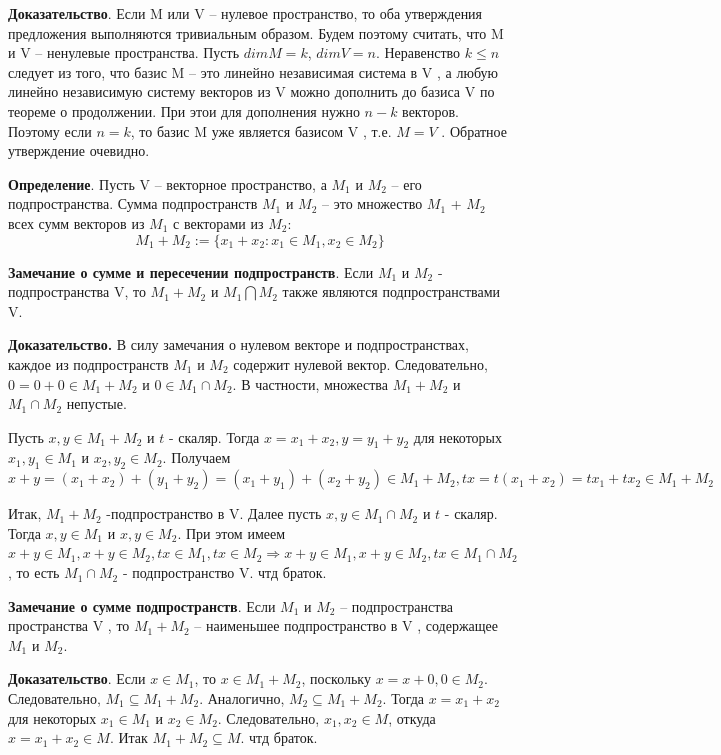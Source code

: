 \documentclass[a4paper]{article}
\begin{document}
{\begin{small}
\textbf{Доказательство}. Если M или V – нулевое пространство, то оба
утверждения предложения выполняются тривиальным образом. Будем
поэтому считать, что M и V – ненулевые пространства. Пусть $dim M = k$,
$dim V = n$. Неравенство $k \leq n$ следует из того, что базис M – это линейно
независимая система в V , а любую линейно независимую систему
векторов из V можно дополнить до базиса V по теореме о продолжении. При этои для дополнения нужно $n-k$ векторов. Поэтому если $n=k$, то базис M уже является базисом V , т.е. $M = V$ . Обратное утверждение очевидно.

\textbf{Определение}. Пусть V – векторное пространство, а $M_1$ и $M_2$ – его подпространства.
Сумма подпространств $M_1$ и $M_2$ – это множество $M_1$ + $M_2$ всех сумм
векторов из $M_1$ с векторами из $M_2$:
\begin{equation}
M_1+M_2 := \{ x_1 + x_2: x_1 \in M_1, x_2 \in M_2 \}
\end{equation}

\textbf{Замечание о сумме и пересечении подпространств}. Если $M_1$ и $M_2$ - подпространства V, то $M_1+M_2$ и $M_1 \bigcap M_2$ также являются подпространствами V.

\textbf{Доказательство.} В силу замечания о нулевом векторе и подпространствах,
каждое из подпространств $M_1$ и $M_2$ содержит нулевой вектор. Следовательно, $0=0+0 \in M_1+M_2$ и $0 \in M_1 \cap M_2$. В частности, множества $M_1+M_2$ и $M_1 \cap M_2$ непустые.

Пусть $x, y \in M_1+M_2$ и $t$ - скаляр. Тогда $x=x_1+x_2, y=y_1+y_2$ для некоторых $x_1, y_1 \in M_1$ и $x_2, y_2 \in M_2$. Получаем \begin{equation}
x+y = (x_1+x_2) + (y_1+y_2) = (x_1+y_1)+(x_2+y_2) \in M_1 + M_2, tx = t(x_1 + x_2) = tx_1 + tx_2 \in M_1 + M_2
\end{equation}

Итак, $M_1+M_2$ -подпространство в V. Далее пусть $x, y \in M_1 \cap M_2$ и $t$ - скаляр. Тогда $x, y \in M_1$ и $x, y \in M_2$. При этом имеем $x+y \in M_1, x+y \in M_2, tx \in M_1, tx \in M_2 \Rightarrow x+y \in M_1, x+y \in M_2, tx \in M_1 \cap M_2$, то есть $M_1 \cap M_2$ - подпространство V. чтд браток.

\textbf{Замечание о сумме подпространств}. Если $M_1$ и $M_2$ – подпространства пространства V , то $M_1 + M_2$ –
наименьшее подпространство в V , содержащее $M_1$ и $M_2$.

\textbf{Доказательство}. Если $x \in M_1$, то $x \in M_1 + M_2$, поскольку $x = x + 0, 0 \in M_2$. Следовательно, $M_1 \subseteq M_1 + M_2$. Аналогично, $M_2 \subseteq M_1 + M_2$. Тогда $x = x_1 + x_2$ для некоторых $x_1 \in M_1$ и $x_2 \in M_2$. Следовательно, $x_1, x_2 \in M$, откуда $x=x_1+x_2 \in M$. Итак $M_1 + M_2 \subseteq M$. чтд браток.


\end{small}}
\end{document}
